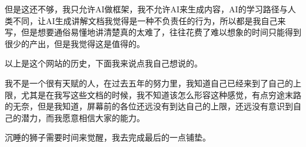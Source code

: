 但是这还不够，我只允许AI做框架，我不允许AI来生成内容，AI的学习路径与人类不同，让AI生成讲解文档我觉得是一种不负责任的行为，所以都是我自己来写，但是想要通俗易懂地讲清楚真的太难了，往往花费了难以想象的时间只能得到很少的产出，但是我觉得这是值得的。

以上是这个网站的历史，下面我来说点我自己想说的。

我不是一个很有天赋的人，在过去五年的努力里，我知道自己已经来到了自己的上限，尤其是在我写这些文档的时候，我不知道该怎么形容这种感觉，有点穷途末路的无奈，但是我知道，屏幕前的各位还远没有到达自己的上限，还远没有意识到自己的潜力，而我愿意相信大家的能力。

沉睡的狮子需要时间来觉醒，我去完成最后的一点铺垫。